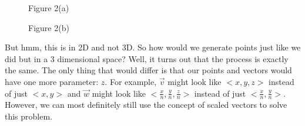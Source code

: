 \documentclass[14pt]{article}
\begin{document}
\begin{figure}[H]
\begin{center}
\begin{minipage}[b]{0.48\textwidth}
\begin{center}
			\end{center}
		\end{minipage}
	\end{center}
	\begin{center}
		\begin{minipage}[t]{0.48\textwidth}
			\caption*{Figure 2(a)}
		\end{minipage}
		\hfill
		\begin{minipage}[t]{0.48\textwidth}
			\caption*{Figure 2(b)}
		\end{minipage}
	\end{center}
\end{figure}

But hmm, this is in 2D and not 3D. So how would we generate points just like we did but in a 3 dimensional space? Well, it turns out that the process is exactly the same. The only thing that would differ is that our points and vectors would have one more parameter: $z$. For example, $\overrightarrow{v}$ might look like $<x, y, z>$ instead of just $<x, y>$ and $\overrightarrow{w}$ might look like $<\frac{x}{n}, \frac{y}{n}, \frac{z}{n}>$ instead of just $<\frac{x}{n}, \frac{y}{n}>$. However, we can most definitely still use the concept of scaled vectors to solve this problem.
\end{document}

